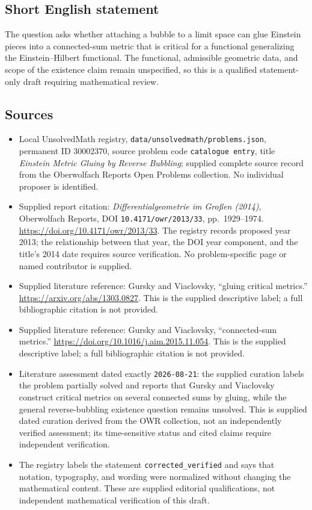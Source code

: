 \documentclass[11pt]{article}
\begin{document}
\subsection{Short English statement}
The question asks whether attaching a bubble to a limit space can glue Einstein pieces into a connected-sum metric that is critical for a functional generalizing the Einstein--Hilbert functional. The functional, admissible geometric data, and scope of the existence claim remain unspecified, so this is a qualified statement-only draft requiring mathematical review.
\subsection{Sources}
\begin{itemize}
\item Local UnsolvedMath registry, \texttt{data/unsolvedmath/problems.json}, permanent ID \(30002370\), source problem code \texttt{catalogue entry}, title \emph{Einstein Metric Gluing by Reverse Bubbling}; supplied complete source record from the Oberwolfach Reports Open Problems collection. No individual proposer is identified.
\item Supplied report citation: \emph{Differentialgeometrie im Großen (2014)}, Oberwolfach Reports, DOI \texttt{10.4171/owr/2013/33}, pp.\ 1929--1974. \url{https://doi.org/10.4171/owr/2013/33}. The registry records proposed year 2013; the relationship between that year, the DOI year component, and the title's 2014 date requires source verification. No problem-specific page or named contributor is supplied.
\item Supplied literature reference: Gursky and Viaclovsky, ``gluing critical metrics.'' \url{https://arxiv.org/abs/1303.0827}. This is the supplied descriptive label; a full bibliographic citation is not provided.
\item Supplied literature reference: Gursky and Viaclovsky, ``connected-sum metrics.'' \url{https://doi.org/10.1016/j.aim.2015.11.054}. This is the supplied descriptive label; a full bibliographic citation is not provided.
\item Literature assessment dated exactly \texttt{2026-08-21}: the supplied curation labels the problem partially solved and reports that Gursky and Viaclovsky construct critical metrics on several connected sums by gluing, while the general reverse-bubbling existence question remains unsolved. This is supplied dated curation derived from the OWR collection, not an independently verified assessment; its time-sensitive status and cited claims require independent verification.
\item The registry labels the statement \texttt{corrected\_verified} and says that notation, typography, and wording were normalized without changing the mathematical content. These are supplied editorial qualifications, not independent mathematical verification of this draft.
\end{itemize}
\end{document}
